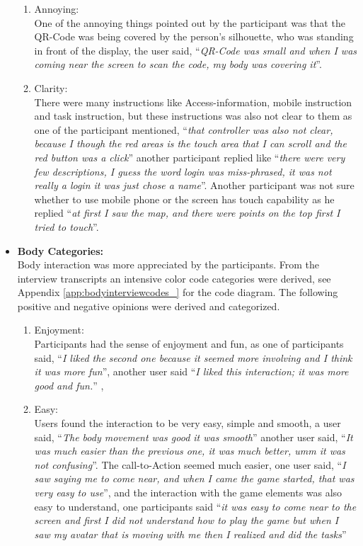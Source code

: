 \begin{itemize}
\begin{enumerate}
\item	Annoying:\\
One of the annoying things pointed out by the participant was that the QR-Code was being covered by the person's silhouette, who was standing in front of the display, the user said, ``\emph{QR-Code was small and when I was coming near the screen to scan the code, my body was covering it}''.

\item	Clarity:\\
There were many instructions like Access-information, mobile instruction and task instruction, but these instructions was also not clear to them as one of the participant mentioned, ``\emph{that controller was also not clear, because I though the red areas is the touch area that I can scroll and the red button was a click}'' another participant replied like ``\emph{there were very few descriptions, I guess the word login was miss-phrased, it was not really a login it was just chose a name}''. Another participant was not sure whether to use mobile phone or the screen has touch capability as he replied ``\emph{at first I saw the map, and there were points on the top first I tried to touch}''.


\end{enumerate}


\item \textbf{Body Categories:} \\
Body interaction was more appreciated by the participants. From the interview transcripts an intensive color code categories were derived, see Appendix \ref{app:bodyinterviewcodes_} for the code diagram. The following positive and negative opinions were derived and categorized. 

\begin{enumerate}
\item	Enjoyment:\\
Participants had the sense of enjoyment and fun, as one of participants said, ``\emph{I liked the second one because it seemed more involving and I think it was more fun}'', another user said ``\emph{I liked this interaction; it was more good and fun.}'' , 

\item	Easy:\\
Users found the interaction to be very easy, simple and smooth, a user said, ``\emph{The body movement was good it was smooth}'' another user said, ``\emph{It was much easier than the previous one, it was much better, umm it was not confusing}''. The call-to-Action seemed much easier, one user said, ``\emph{I saw saying me to come near, and when I came the game started, that was very easy to use}'', and the interaction with the game elements was also easy to understand, one participants said ``\emph{it was easy to come near to the screen and first I did not understand how to play the game but when I saw my avatar that is moving with me then I realized and did the tasks}''


\end{enumerate}
\end{itemize}
